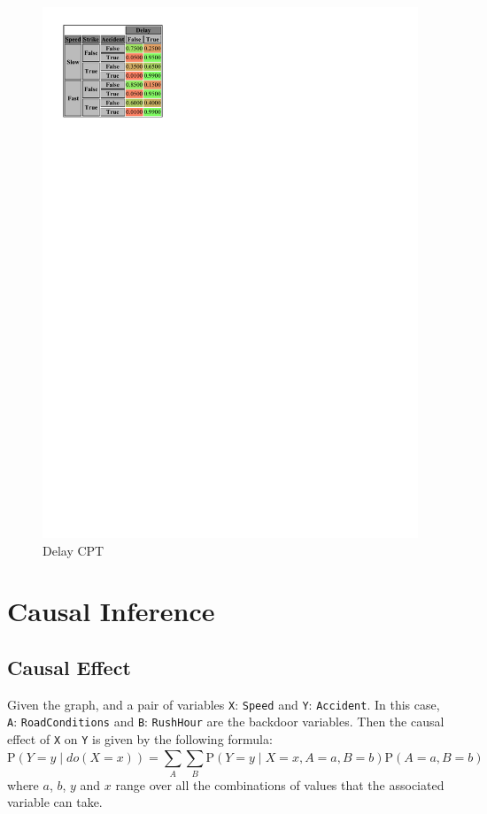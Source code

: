 \documentclass[a4paper,12pt]{article} %
\begin{document}
\begin{figure}[H]
\begin{center}
\begin{minipage}[c]{.45\textwidth}
		\includegraphics[width=.9\linewidth]{../code/delay.pdf}	
		\caption*{Delay CPT}
		\label{fig:delay}
	\end{minipage}

\end{center}
\end{figure}

\section{Causal Inference}

\subsection*{Causal Effect}
Given the graph, and a pair of variables \texttt{X}: \texttt{Speed} and \texttt{Y}: \texttt{Accident}. In this case, \texttt{A}: \texttt{RoadConditions} and \texttt{B}: \texttt{RushHour} are the backdoor variables. Then the causal effect of \texttt{X} on \texttt{Y} is given by the following formula:
\begin{equation}
	\text{P}(Y = y \mid {do}(X = x)) = \sum_{A}^{}\sum_{B}^{}	\text{P}(Y = y \mid X = x, A = a, B = b)\text{P}(A = a, B = b)
\end{equation}
where $a$, $b$, $y$ and $x$ range over all the combinations of values that the associated variable can take.\\
\end{document}
